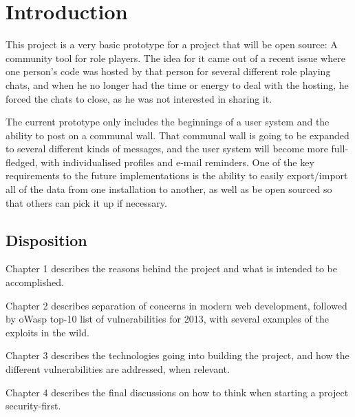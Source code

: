 \chapter{Introduction}
\label{ch:introduction}
\noindent
This project is a very basic prototype for a project that will be open source: A community tool for role players. The idea for it came out of a recent issue where one person's code was hosted by that person for several different role playing chats, and when he no longer had the time or energy to deal with the hosting, he forced the chats to close, as he was not interested in sharing it.

The current prototype only includes the beginnings of a user system and the ability to post on a communal wall. That communal wall is going to be expanded to several different kinds of messages, and the user system will become more full-fledged, with individualised profiles and e-mail reminders. One of the key requirements to the future implementations is the ability to easily export/import all of the data from one installation to another, as well as be open sourced so that others can pick it up if necessary.

\section{Disposition}
\label{ch:disposition}
\noindent
Chapter 1 describes the reasons behind the project and what is intended to be accomplished.

Chapter 2 describes separation of concerns in modern web development, followed by oWasp top-10 list of vulnerabilities for 2013, with several examples of the exploits in the wild.

Chapter 3 describes the technologies going into building the project, and how the different vulnerabilities are addressed, when relevant.

Chapter 4 describes the final discussions on how to think when starting a project security-first.


